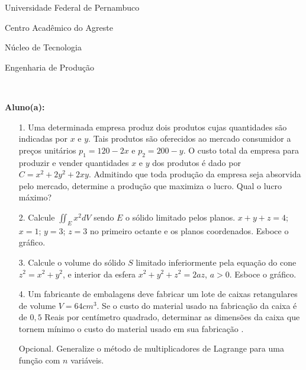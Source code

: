 \documentclass[oneside,a4paper,12pt]{article}
\newcommand{\universidade}{Universidade Federal de Pernambuco}
\newcommand{\centro}{Centro Acadêmico do Agreste}
\newcommand{\departamento}{Núcleo de Tecnologia}
\newcommand{\curso}{Engenharia de Produção}
\begin{document}
	\pagestyle{empty}
	
	\begin{center}
	 	\vspace{0pt}
	 	
		\universidade
		\par
		\centro
		\par
		\departamento
		\par
		\curso
		\par
		\vspace{08pt}
		\\
	\end{center}
	
	
	\begin{flushleft}
		\textbf{Aluno(a):}
	\end{flushleft}
	
\begin{itemize}
\item[1.] Uma determinada empresa produz dois produtos cujas quantidades são indicadas por $x$ e $y$. Tais produtos são oferecidos ao mercado consumidor a preços unitários $p_{1}=120-2x$ e $p_{2}=200-y$. O custo total da empresa para produzir e vender quantidades $x$ e $y$ dos produtos é dado por $C=x^{2}+2y^{2}+2xy$. Admitindo que toda produção da empresa seja absorvida pelo mercado, determine a produção que maximiza o lucro. Qual o lucro máximo?
\end{itemize}
\begin{itemize}
\item[2.] Calcule $\iint_{E} x^{2}dV$ sendo $E$ o sólido limitado pelos planos. $x+y+z=4$; $x=1$; $y=3$; $z=3$ no primeiro octante e os planos coordenados. Esboce o gráfico. 
 \end{itemize}
 \begin{itemize}
\item [3.] Calcule o volume do sólido $S$ limitado inferiormente pela equação do cone $z^{2}=x^{2}+y^{2}$, e interior da esfera $x^{2}+y^{2}+z^{2}=2az$, $a>0$. Esboce o gráfico.
\end{itemize}
\begin{itemize}
\item[4.] Um fabricante de embalagens deve fabricar um lote de caixas retangulares de volume $V=64cm^{3}$. Se o custo do material usado na fabricação da caixa é de $ 0,5$ Reais por centímetro quadrado, determinar as dimensões da caixa que tornem mínimo o custo do material usado em sua fabricação .
\end{itemize}
\begin{itemize}
	\item[Opcional.] Generalize o método de multiplicadores de Lagrange para uma função com $n$ variáveis.
\end{itemize}
\end{document}
